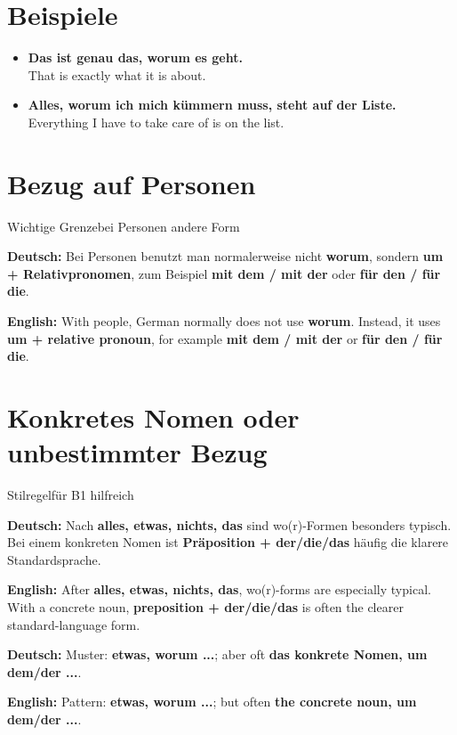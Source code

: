 \documentclass[a4paper,11pt]{article}
\newcommand{\GermanText}[1]{\textbf{Deutsch: }#1\par}
\newcommand{\EnglishText}[1]{{\small\color{SoftGray}\textbf{English: }#1\par}}
\newcommand{\ExampleItem}[2]{\item \textbf{#1}\\{\small\color{SoftGray}#2}}
\begin{document}
\section{Beispiele}

\begin{exbox}

\begin{itemize}

\ExampleItem{Das ist genau das, worum es geht.}{That is exactly what it is about.}

\ExampleItem{Alles, worum ich mich kümmern muss, steht auf der Liste.}{Everything I have to take care of is on the list.}

\end{itemize}

\end{exbox}

\section{Bezug auf Personen}

\begin{grammarentry}{Wichtige Grenze}{bei Personen andere Form}

\GermanText{Bei Personen benutzt man normalerweise nicht \textbf{worum}, sondern \textbf{um + Relativpronomen}, zum Beispiel \textbf{mit dem / mit der} oder \textbf{für den / für die}.}

\EnglishText{With people, German normally does not use \textbf{worum}. Instead, it uses \textbf{um + relative pronoun}, for example \textbf{mit dem / mit der} or \textbf{für den / für die}.}

\end{grammarentry}

\section{Konkretes Nomen oder unbestimmter Bezug}

\begin{grammarentry}{Stilregel}{für B1 hilfreich}

\GermanText{Nach \textbf{alles, etwas, nichts, das} sind wo(r)-Formen besonders typisch. Bei einem konkreten Nomen ist \textbf{Präposition + der/die/das} häufig die klarere Standardsprache.}

\EnglishText{After \textbf{alles, etwas, nichts, das}, wo(r)-forms are especially typical. With a concrete noun, \textbf{preposition + der/die/das} is often the clearer standard-language form.}

\GermanText{Muster: \textbf{etwas, worum ...}; aber oft \textbf{das konkrete Nomen, um dem/der ...}.}

\EnglishText{Pattern: \textbf{etwas, worum ...}; but often \textbf{the concrete noun, um dem/der ...}.}

\end{grammarentry}
\end{document}
